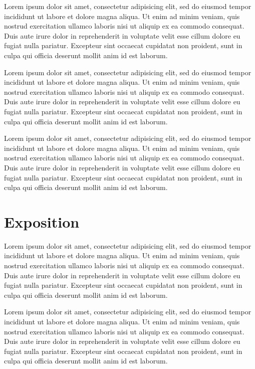 \documentclass[conference]{acmsiggraph}
\begin{document}
Lorem ipsum dolor sit amet, consectetur adipisicing elit, sed do
eiusmod tempor incididunt ut labore et dolore magna aliqua. Ut enim ad
minim veniam, quis nostrud exercitation ullamco laboris nisi ut
aliquip ex ea commodo consequat. Duis aute irure dolor in
reprehenderit in voluptate velit esse cillum dolore eu fugiat nulla
pariatur. Excepteur sint occaecat cupidatat non proident, sunt in
culpa qui officia deserunt mollit anim id est laborum.

Lorem ipsum dolor sit amet, consectetur adipisicing elit, sed do
eiusmod tempor incididunt ut labore et dolore magna aliqua. Ut enim ad
minim veniam, quis nostrud exercitation ullamco laboris nisi ut
aliquip ex ea commodo consequat. Duis aute irure dolor in
reprehenderit in voluptate velit esse cillum dolore eu fugiat nulla
pariatur. Excepteur sint occaecat cupidatat non proident, sunt in
culpa qui officia deserunt mollit anim id est laborum.

Lorem ipsum dolor sit amet, consectetur adipisicing elit, sed do
eiusmod tempor incididunt ut labore et dolore magna aliqua. Ut enim ad
minim veniam, quis nostrud exercitation ullamco laboris nisi ut
aliquip ex ea commodo consequat. Duis aute irure dolor in
reprehenderit in voluptate velit esse cillum dolore eu fugiat nulla
pariatur. Excepteur sint occaecat cupidatat non proident, sunt in
culpa qui officia deserunt mollit anim id est laborum.

\section{Exposition}

Lorem ipsum dolor sit amet, consectetur adipisicing elit, sed do
eiusmod tempor incididunt ut labore et dolore magna aliqua. Ut enim ad
minim veniam, quis nostrud exercitation ullamco laboris nisi ut
aliquip ex ea commodo consequat. Duis aute irure dolor in
reprehenderit in voluptate velit esse cillum dolore eu fugiat nulla
pariatur. Excepteur sint occaecat cupidatat non proident, sunt in
culpa qui officia deserunt mollit anim id est laborum.

Lorem ipsum dolor sit amet, consectetur adipisicing elit, sed do
eiusmod tempor incididunt ut labore et dolore magna aliqua. Ut enim ad
minim veniam, quis nostrud exercitation ullamco laboris nisi ut
aliquip ex ea commodo consequat. Duis aute irure dolor in
reprehenderit in voluptate velit esse cillum dolore eu fugiat nulla
pariatur. Excepteur sint occaecat cupidatat non proident, sunt in
culpa qui officia deserunt mollit anim id est laborum.
\end{document}
